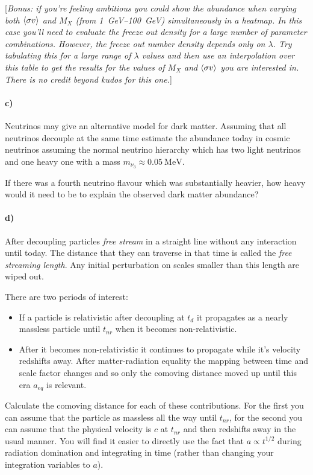 \documentclass[12pt]{article}
\begin{document}
[\emph{Bonus: if you're feeling ambitious you could show the abundance when varying both $\langle \sigma v \rangle$ and $M_X$ (from \SIrange{1}{100}{\GeV}) simultaneously in a heatmap. In this case you'll need to evaluate the freeze out density for a large number of parameter combinations. However, the freeze out number density depends only on $\lambda$. Try tabulating this for a large range of $\lambda$ values and then use an interpolation over this table to get the results for the values of $M_X$ and $\langle \sigma v \rangle$ you are interested in. There is no credit beyond kudos for this one.}]

\paragraph{c)} Neutrinos may give an alternative model for dark matter. Assuming that all neutrinos decouple at the same time estimate the abundance today in cosmic neutrinos assuming the normal neutrino hierarchy which has two light neutrinos and one heavy one with a mass $m_{\nu_3} \approx \SI{0.05}{\mega\electronvolt}$.

If there was a fourth neutrino flavour which was substantially heavier, how heavy would it need to be to explain the observed dark matter abundance?

\paragraph{d)} After decoupling particles \emph{free stream} in a straight line without any interaction until today. The distance that they can traverse in that time is called the \emph{free streaming length}. Any initial perturbation on scales smaller than this length are wiped out.

There are two periods of interest:
\begin{itemize}
    \item If a particle is relativistic after decoupling at $t_d$ it propagates as a nearly massless particle until $t_{nr}$ when it becomes non-relativistic.
    \item After it becomes non-relativistic it continues to propagate while it's velocity redshifts away. After matter-radiation equality the mapping between time and scale factor changes and so only the comoving distance moved up until this era $a_{eq}$ is relevant.
\end{itemize}
Calculate the comoving distance for each of these contributions. For the first you can assume that the particle as massless all the way until $t_{nr}$, for the second you can assume that the physical velocity is $c$ at $t_{nr}$ and then redshifts away in the usual manner. You will find it easier to directly use the fact that $a \propto t^{1/2}$ during radiation domination and integrating in time (rather than changing your integration variables to $a$).
\end{document}
